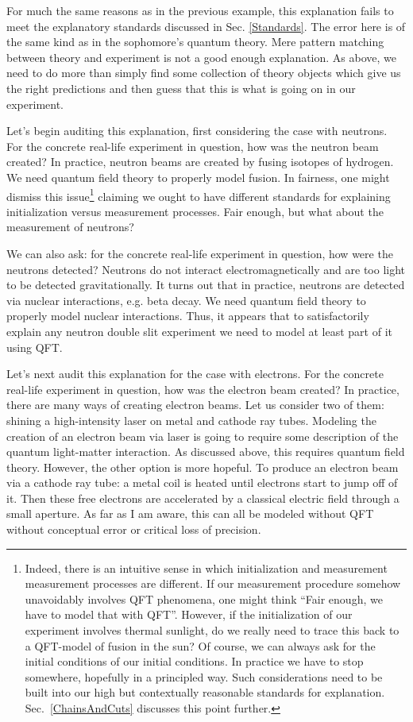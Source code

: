 \documentclass[prd,twocolumn,superscriptaddress,floatfix,amsmath,amssymb,amsfonts,nofootinbib]{revtex4-2}
\begin{document}
For much the same reasons as in the previous example, this explanation fails to meet the explanatory standards discussed in Sec. \ref{Standards}. The error here is of the same kind as in the sophomore's quantum theory. Mere pattern matching between theory and experiment is not a good enough explanation. As above, we need to do more than simply find some collection of theory objects which give us the right predictions and then guess that this is what is going on in our experiment.

Let's begin auditing this explanation, first considering the case with neutrons. For the concrete real-life experiment in question, how was the neutron beam created? In practice, neutron beams are created by fusing isotopes of hydrogen. We need quantum field theory to properly model fusion. In fairness, one might dismiss this issue\footnote{Indeed, there is an intuitive sense in which initialization and measurement measurement processes are different. If our measurement procedure somehow unavoidably involves QFT phenomena, one might think ``Fair enough, we have to model that with QFT''. However, if the initialization of our experiment involves thermal sunlight, do we really need to trace this back to a QFT-model of fusion in the sun? Of course, we can always ask for the initial conditions of our initial conditions. In practice we have to stop somewhere, hopefully in a principled way. Such considerations need to be built into our high but contextually reasonable standards for explanation. Sec.~\ref{ChainsAndCuts} discusses this point further.} claiming we ought to have different standards for explaining initialization versus measurement processes. Fair enough, but what about the measurement of neutrons?

We can also ask: for the concrete real-life experiment in question, how were the neutrons detected? Neutrons do not interact electromagnetically and are too light to be detected gravitationally. It turns out that in practice, neutrons are detected via nuclear interactions, e.g. beta decay. We need quantum field theory to properly model nuclear interactions. Thus, it appears that to satisfactorily explain any neutron double slit experiment we need to model at least part of it using QFT.

Let's next audit this explanation for the case with electrons. For the concrete real-life experiment in question, how was the electron beam created? In practice, there are many ways of creating electron beams. Let us consider two of them: shining a high-intensity laser on metal and cathode ray tubes. Modeling the creation of an electron beam via laser is going to require some description of the quantum light-matter interaction. As discussed above, this requires quantum field theory. However, the other option is more hopeful. To produce an electron beam via a cathode ray tube: a metal coil is heated until electrons start to jump off of it. Then these free electrons are accelerated by a classical electric field through a small aperture. As far as I am aware, this can all be modeled without QFT without conceptual error or critical loss of precision.
\end{document}
